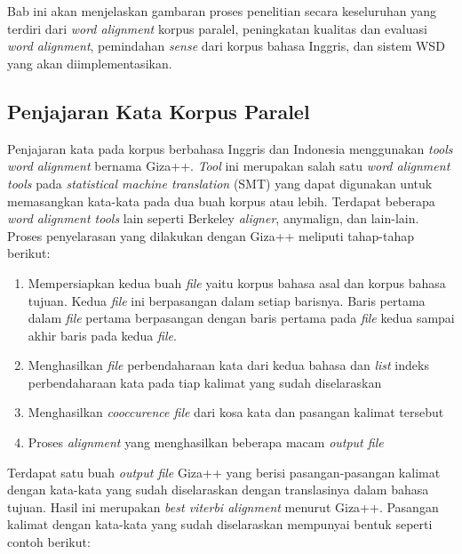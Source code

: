 \chapter{\babTiga}
Bab ini akan menjelaskan gambaran proses penelitian secara keseluruhan yang terdiri dari \textit{word alignment} korpus paralel, peningkatan kualitas dan evaluasi \textit{word alignment}, pemindahan \textit{sense} dari korpus bahasa Inggris, dan sistem WSD yang akan diimplementasikan.

\section{Penjajaran Kata Korpus Paralel}
Penjajaran kata pada korpus berbahasa Inggris dan Indonesia menggunakan \textit{tools word alignment} bernama Giza++. \textit{Tool} ini merupakan salah satu \textit{word alignment tools} pada \textit{statistical machine translation} (SMT) yang dapat digunakan untuk memasangkan kata-kata pada dua buah korpus atau lebih. Terdapat beberapa \textit{word alignment tools} lain seperti Berkeley \textit{aligner}, anymalign, dan lain-lain. Proses penyelarasan yang dilakukan dengan Giza++ meliputi tahap-tahap berikut:
\begin{enumerate}
	\item Mempersiapkan kedua buah \textit{file} yaitu korpus bahasa asal dan korpus bahasa tujuan. Kedua \textit{file} ini berpasangan dalam setiap barisnya. Baris pertama dalam \textit{file} pertama berpasangan dengan baris pertama pada \textit{file} kedua sampai akhir baris pada kedua \textit{file}.
	\item Menghasilkan \textit{file} perbendaharaan kata dari kedua bahasa dan \textit{list} indeks perbendaharaan kata pada tiap kalimat yang sudah diselaraskan
	\item Menghasilkan \textit{cooccurence file} dari kosa kata dan pasangan kalimat tersebut
	\item Proses \textit{alignment} yang menghasilkan beberapa macam \textit{output file} 
\end{enumerate}

Terdapat satu buah \textit{output file} Giza++ yang berisi pasangan-pasangan kalimat dengan kata-kata yang sudah diselaraskan dengan translasinya dalam bahasa tujuan. Hasil ini merupakan \textit{best viterbi alignment} menurut Giza++. Pasangan kalimat dengan kata-kata yang sudah diselaraskan mempunyai bentuk seperti contoh berikut:

